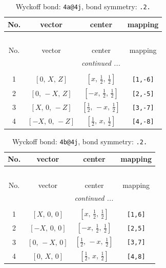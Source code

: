 \documentclass[fleqn,8pt]{jsarticle}
\begin{document}
\begin{longtable}{cccc}
\caption{Wyckoff bond: {\tt 4a@4j}, bond symmetry: {\tt .2.}}
 \\
 \hline \hline
No. & vector & center & mapping \\ \hline \endfirsthead

\multicolumn{3}{l}{\tablename\ \thetable{}} \\
 \hline \hline
No. & vector & center & mapping \\ \hline \endhead

 \hline \hline
\multicolumn{3}{r}{\footnotesize\it continued ...} \\ \endfoot

 \hline \hline
\multicolumn{3}{r}{} \\ \endlastfoot

1 & $\left[ 0,\, X,\, Z \right]$ & $\left[ x,\, \frac{1}{2},\, \frac{1}{2} \right]$ & {\tt [1,-6]} \\ \hline
2 & $\left[ 0,\, - X,\, Z \right]$ & $\left[ - x,\, \frac{1}{2},\, \frac{1}{2} \right]$ & {\tt [2,-5]} \\ \hline
3 & $\left[ X,\, 0,\, - Z \right]$ & $\left[ \frac{1}{2},\, - x,\, \frac{1}{2} \right]$ & {\tt [3,-7]} \\ \hline
4 & $\left[ - X,\, 0,\, - Z \right]$ & $\left[ \frac{1}{2},\, x,\, \frac{1}{2} \right]$ & {\tt [4,-8]} \\
\end{longtable}
\renewcommand{\arraystretch}{1.2}
\begin{longtable}{cccc}
\caption{Wyckoff bond: {\tt 4b@4j}, bond symmetry: {\tt .2.}}
 \\
 \hline \hline
No. & vector & center & mapping \\ \hline \endfirsthead

\multicolumn{3}{l}{\tablename\ \thetable{}} \\
 \hline \hline
No. & vector & center & mapping \\ \hline \endhead

 \hline \hline
\multicolumn{3}{r}{\footnotesize\it continued ...} \\ \endfoot

 \hline \hline
\multicolumn{3}{r}{} \\ \endlastfoot

1 & $\left[ X,\, 0,\, 0 \right]$ & $\left[ x,\, \frac{1}{2},\, \frac{1}{2} \right]$ & {\tt [1,6]} \\ \hline
2 & $\left[ - X,\, 0,\, 0 \right]$ & $\left[ - x,\, \frac{1}{2},\, \frac{1}{2} \right]$ & {\tt [2,5]} \\ \hline
3 & $\left[ 0,\, - X,\, 0 \right]$ & $\left[ \frac{1}{2},\, - x,\, \frac{1}{2} \right]$ & {\tt [3,7]} \\ \hline
4 & $\left[ 0,\, X,\, 0 \right]$ & $\left[ \frac{1}{2},\, x,\, \frac{1}{2} \right]$ & {\tt [4,8]} \\
\end{longtable}
\end{document}
